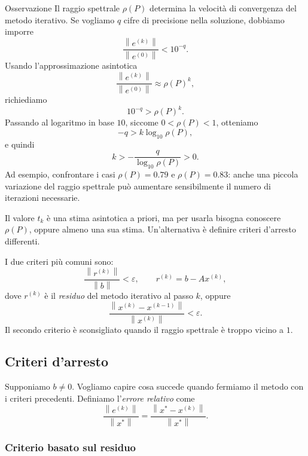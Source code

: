 \documentclass[a4paper]{article}
\newcommand{\norm}[1]{\left\lVert#1\right\rVert}
\begin{document}
\begin{snippetproposition}{Osservazione}
    Il raggio spettrale \(\rho(P)\) determina la velocità di convergenza del metodo iterativo. Se vogliamo
    \(q\) cifre di precisione nella soluzione, dobbiamo imporre
    \[
        \frac{\norm{e^{(k)}}}{\norm{e^{(0)}}}<10^{-q}.
    \]
    Usando l'approssimazione asintotica
    \[
        \frac{\norm{e^{(k)}}}{\norm{e^{(0)}}}
        \approx
        \rho(P)^k,
    \]
    richiediamo
    \[
        10^{-q}>\rho(P)^k.
    \]
    Passando al logaritmo in base \(10\), siccome \(0<\rho(P)<1\), otteniamo
    \[
        -q>k\log_{10}\rho(P),
    \]
    e quindi
    \[
        k>
        -\frac{q}{\log_{10}\rho(P)}
        >0.
    \]
    Ad esempio, confrontare i casi \(\rho(P)=0.79\) e \(\rho(P)=0.83\): anche una piccola variazione del
    raggio spettrale può aumentare sensibilmente il numero di iterazioni necessarie.
\end{snippetproposition}

Il valore \(t_k\) è una stima asintotica a priori, ma per usarla bisogna conoscere \(\rho(P)\), oppure almeno
una sua stima. Un'alternativa è definire criteri d'arresto differenti.

I due criteri più comuni sono:
\[
    \frac{\norm{r^{(k)}}}{\norm{b}}<\varepsilon,
    \qquad
    r^{(k)}=b-Ax^{(k)},
\]
dove \(r^{(k)}\) è il \emph{residuo} del metodo iterativo al passo \(k\), oppure
\[
    \frac{\norm{x^{(k)}-x^{(k-1)}}}{\norm{x^{(k)}}}<\varepsilon.
\]
Il secondo criterio è sconsigliato quando il raggio spettrale è troppo vicino a \(1\).

\subsection{Criteri d'arresto}

Supponiamo \(b\neq 0\). Vogliamo capire cosa succede quando fermiamo il metodo con i criteri precedenti. Definiamo l'\emph{errore relativo}
come
\[
    \frac{\norm{e^{(k)}}}{\norm{x^\ast}}
    =
    \frac{\norm{x^\ast-x^{(k)}}}{\norm{x^\ast}}.
\]

\subsubsection{Criterio basato sul residuo}
\end{document}
